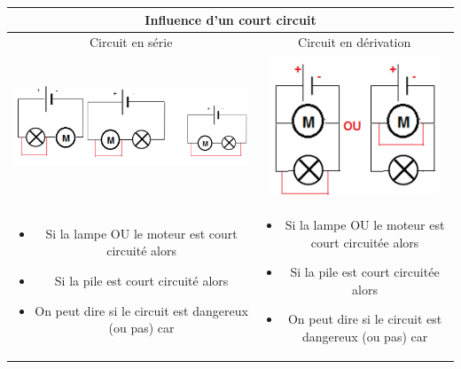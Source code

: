\documentclass[10pt]{article}
\begin{document}
	\begin{tabular}{cc} \toprule
		\multicolumn{2}{c}{Influence d'un court circuit} \\ \midrule
		Circuit en série & Circuit en dérivation\\ \midrule
		\includegraphics[width=0.45\columnwidth]{court_circuit1.png} 
								& \includegraphics[width=0.2\columnwidth]{court_circuit2.png} \\
		\parbox[t]{0.47\textwidth}{
			\begin{itemize}
				\item Si la lampe OU le moteur est court circuité alors
			\end{itemize}
			\begin{itemize}
				\item Si la pile est court circuité alors 
			\end{itemize}
			\begin{itemize}
				\item On peut dire si le circuit est dangereux (ou pas) car
			\end{itemize}
			}
								& \parbox[t]{0.47\textwidth}{
									\begin{itemize}
										\item Si la lampe OU le moteur est court circuitée alors
									\end{itemize}
									\begin{itemize}
										\item Si la pile est court circuitée alors 
									\end{itemize}
									\begin{itemize}
										\item On peut dire si le circuit est dangereux (ou pas) car
									\end{itemize}
									} \\
	\end{tabular}
\end{document}
